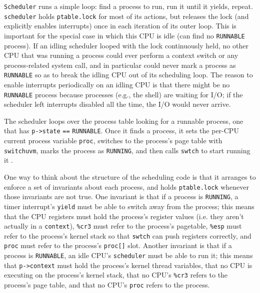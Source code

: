 \lstinline{Scheduler}
runs a simple loop:
find a process to run, run it until it yields, repeat.
\lstinline{scheduler}
holds
\lstinline{ptable.lock}
for most of its actions,
but releases the lock (and explicitly enables interrupts)
once in each iteration of its outer loop.
This is important for the special case in which this CPU
is idle (can find no
\lstinline{RUNNABLE}
process).
If an idling scheduler looped with
the lock continuously held, no other CPU that
was running a process could ever perform a context
switch or any process-related system call,
and in particular could never mark a process as
\lstinline{RUNNABLE}
so as to break the idling CPU out of its scheduling loop.
The reason to enable interrupts periodically on an idling
CPU is that there might be no
\lstinline{RUNNABLE}
process because processes (e.g., the shell) are
waiting for I/O;
if the scheduler left interrupts disabled all the time,
the I/O would never arrive.

The scheduler
loops over the process table
looking for a runnable process, one that has
\lstinline{p->state} 
\lstinline{==}
\lstinline{RUNNABLE}.
Once it finds a process, it sets the per-CPU current process
variable
\lstinline{proc},
switches to the process's page table with
\lstinline{switchuvm},
marks the process as
\lstinline{RUNNING},
and then calls
\lstinline{swtch}
to start running it
.

One way to think about the structure of the scheduling code is
that it arranges to enforce a set of invariants about each process,
and holds
\lstinline{ptable.lock}
whenever those invariants are not true.
One invariant is that if a process is
\lstinline{RUNNING},
a timer interrupt's
\lstinline{yield}
must be able to switch away from the process;
this means that the CPU registers must hold the process's register values
(i.e. they aren't actually in a
\lstinline{context}),
\texttt{\%cr3}
must refer to the process's pagetable,
\texttt{\%esp}
must refer to the process's kernel stack so that
\lstinline{swtch}
can push registers correctly, and
\lstinline{proc}
must refer to the process's
\lstinline{proc[]}
slot.
Another invariant is that if a process is
\lstinline{RUNNABLE},
an idle CPU's
\lstinline{scheduler}
must be able to run it;
this means that 
\lstinline{p->context}
must hold the process's kernel thread variables,
that no CPU is executing on the process's kernel stack,
that no CPU's
\texttt{\%cr3}
refers to the process's page table,
and that no CPU's
\lstinline{proc}
refers to the process.

